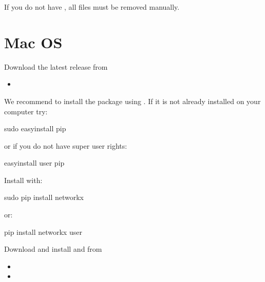 \documentclass[letterpaper,10pt,english]{sphinxmanual}
\begin{document}
If you do not have , all files must be removed manually.


\section{Mac OS}
\label{\detokenize{Installation:mac-os}}
Download the latest release from
\begin{itemize}
\item {} 

\end{itemize}

We recommend to install the package using . If it is not already installed on your computer try:

\begin{sphinxVerbatim}[commandchars=\\\{\}]
\PYGZdl{} sudo easy\PYGZus{}install pip
\end{sphinxVerbatim}

or if you do not have super user rights:

\begin{sphinxVerbatim}[commandchars=\\\{\}]
\PYGZdl{} easy\PYGZus{}install \PYGZhy{}\PYGZhy{}user pip
\end{sphinxVerbatim}

Install  with:

\begin{sphinxVerbatim}[commandchars=\\\{\}]
\PYGZdl{} sudo pip install networkx
\end{sphinxVerbatim}

or:

\begin{sphinxVerbatim}[commandchars=\\\{\}]
\PYGZdl{} pip install networkx \PYGZhy{}\PYGZhy{}user
\end{sphinxVerbatim}

Download and install  and  from
\begin{itemize}
\item {} 

\item {} 

\end{itemize}
\end{document}
